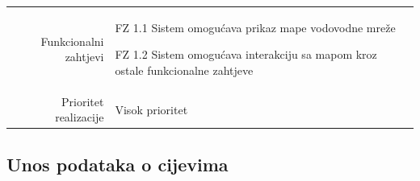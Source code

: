 \documentclass[]{report}
\begin{document}
\begin{tabular}{rp{}}
\\
Funkcionalni zahtjevi &
 
\begin{compactitem}
  \item FZ 1.1 Sistem omogućava prikaz mape vodovodne mreže 
    \item FZ 1.2 Sistem omogućava interakciju sa mapom kroz ostale funkcionalne zahtjeve
  
\end{compactitem}
 
\\
Prioritet realizacije &
\hspace{12pt} Visok prioritet

\end{tabular}



\subsection{Unos podataka o cijevima}
 
\end{document}
